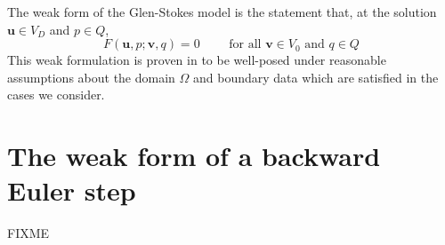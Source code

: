 \documentclass[letterpaper,final,12pt,reqno]{amsart}
\newcommand{\bu}{\mathbf{u}}
\newcommand{\bv}{\mathbf{v}}
\begin{document}
The weak form of the Glen-Stokes model is the statement that, at the solution $\bu\in V_D$ and $p\in Q$,
\begin{equation}
F(\bu,p;\bv,q) = 0 \qquad \text{ for all } \bv\in V_0 \text{ and } q\in Q  \label{weak}
\end{equation}
This weak formulation is proven in \cite[Theorem 3.8]{JouvetRappaz2011} to be well-posed under reasonable assumptions about the domain $\Omega$ and boundary data which are satisfied in the cases we consider.


\section{The weak form of a backward Euler step}

FIXME


\small

\bigskip


\end{document}
